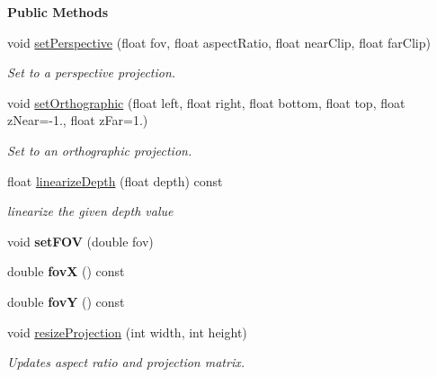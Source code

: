 \begin{Indent}\textbf{ Public Methods}\par
\begin{DoxyCompactItemize}
\item 
\mbox{\label{classrev_1_1_render_projection_a156dce9260502d08ac8e506b378b47b1}} 
void \mbox{\hyperlink{classrev_1_1_render_projection_a156dce9260502d08ac8e506b378b47b1}{set\+Perspective}} (float fov, float aspect\+Ratio, float near\+Clip, float far\+Clip)
\begin{DoxyCompactList}\small\item\em Set to a perspective projection. \end{DoxyCompactList}\item 
\mbox{\label{classrev_1_1_render_projection_a4e930a9d5494deb9c90ecf7c77b71da2}} 
void \mbox{\hyperlink{classrev_1_1_render_projection_a4e930a9d5494deb9c90ecf7c77b71da2}{set\+Orthographic}} (float left, float right, float bottom, float top, float z\+Near=-\/1., float z\+Far=1.)
\begin{DoxyCompactList}\small\item\em Set to an orthographic projection. \end{DoxyCompactList}\item 
\mbox{\label{classrev_1_1_render_projection_a16d32ecb3c0f31238c57b192d34bfb76}} 
float \mbox{\hyperlink{classrev_1_1_render_projection_a16d32ecb3c0f31238c57b192d34bfb76}{linearize\+Depth}} (float depth) const
\begin{DoxyCompactList}\small\item\em linearize the given depth value \end{DoxyCompactList}\item 
\mbox{\label{classrev_1_1_render_projection_af1afae06c36e6442e927014dbb1b4651}} 
void {\bfseries set\+F\+OV} (double fov)
\item 
\mbox{\label{classrev_1_1_render_projection_a1ff19b62979c0940c048f8a203e68830}} 
double {\bfseries fovX} () const
\item 
\mbox{\label{classrev_1_1_render_projection_abc031d7f4f7e2b985ee66c3e52ee1f9b}} 
double {\bfseries fovY} () const
\item 
void \mbox{\hyperlink{classrev_1_1_render_projection_ae8f4a509e0244639be2b2c94b75549b7}{resize\+Projection}} (int width, int height)
\begin{DoxyCompactList}\small\item\em Updates aspect ratio and projection matrix. \end{DoxyCompactList}\end{DoxyCompactItemize}
\end{Indent}
